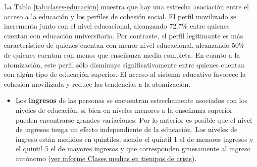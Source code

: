 \documentclass[
  12pt,
]{book}
\providecommand{\tightlist}{%
  \setlength{\itemsep}{0pt}\setlength{\parskip}{0pt}}
\begin{document}
\begin{table}

\caption{\label{tab:clases-educacion}Efecto de la educación sobre los perfiles de cohesión social en porcentaje}
\centering
{}
\end{table}

La Tabla \ref{tab:clases-educacion} muestra que hay una estrecha asociación entre el acceso a la educación y los perfiles de cohesión social. El perfil movilizado se incrementa junto con el nivel educacional, alcanzando 72.7\% entre quienes cuentan con educación universitaria. Por contraste, el perfil legitimante es más característico de quienes cuentan con menor nivel educacional, alcanzando 50\% de quienes cuentan con menos que enseñanza media completa. En cuanto a la atomización, este perfil sólo disminuye significativamente entre quienes cuentan con algún tipo de educación superior. El acceso al sistema educativo favorece la cohesión movilizada y reduce las tendencias a la atomización.

\begin{itemize}
\tightlist
\item
  Los \textbf{ingresos} de las personas se encuentran estrechamente asociados con los niveles de educación, si bien en niveles menores a la enseñanza superior pueden encontrarse grandes variaciones. Por lo anterior es posible que el nivel de ingresos tenga un efecto independiente de la educación. Los niveles de ingreso están medidos en quintiles, siendo el quintil 1 el de menores ingresos y el quintil 5 el de mayores ingresos y que corresponden gruesamente al ingreso autónomo (\href{https://drive.google.com/file/d/12PsOPviSGwowOsxzvZn_vhwEoMbyMkl3/view}{ver informe Clases medias en tiempos de crisis}).
\end{itemize}
\end{document}
